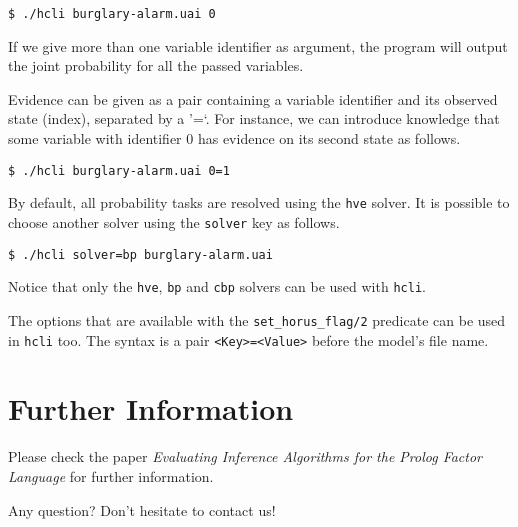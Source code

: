 \documentclass{article}
\begin{document}
\texttt{\$ ./hcli burglary-alarm.uai 0}

If we give more than one variable identifier as argument, the program will output the joint probability for all the passed variables.

Evidence can be given as a pair containing a variable identifier and its observed state (index), separated by a '=`. For instance, we can introduce knowledge that some variable with identifier $0$ has evidence on its second state as follows.

\texttt{\$ ./hcli burglary-alarm.uai 0=1}

By default, all probability tasks are resolved using the \texttt{hve} solver. It is possible to choose another solver using the \texttt{solver} key as follows.

\texttt{\$ ./hcli solver=bp burglary-alarm.uai}

Notice that only the \texttt{hve}, \texttt{bp} and \texttt{cbp} solvers can be used with \texttt{hcli}.

The options that are available with the \texttt{set\_horus\_flag/2} predicate can be used in \texttt{hcli} too. The syntax is a pair \texttt{<Key>=<Value>} before the model's file name.



\section{Further Information}
Please check the paper \textit{Evaluating Inference Algorithms for the Prolog Factor Language} for further information.

Any question? Don't hesitate to contact us!
\end{document}
